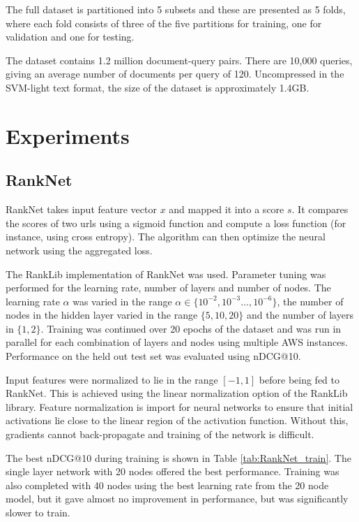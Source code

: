 \documentclass[english]{article}
\theoremstyle{definition}
\begin{document}
\begin{multicols}{2}
The full dataset is partitioned into 5 subsets and these are presented as 5 folds, where each fold consists of three of the five partitions for training, one for validation and one for testing.  

The dataset contains 1.2 million document-query pairs.  There are 10,000 queries, giving an average number of documents per query of 120.  Uncompressed in the SVM-light text format, the size of the dataset is approximately 1.4GB.

\section{Experiments}

\subsection{RankNet}

RankNet takes input feature vector $x$ and mapped it into a score $s$. It compares the scores of two urls using a sigmoid function and compute a loss function (for instance, using cross entropy). The algorithm can then optimize the neural network using the aggregated loss.

The RankLib \cite{Lemur} implementation of RankNet was used.  Parameter tuning was performed for the learning rate, number of layers and number of nodes.  The learning rate $\alpha$ was varied in the range $\alpha \in \{10^{-2},10^{-3} \ldots, 10^{-6}\}$, the number of nodes in the hidden layer varied in the range $\{5, 10, 20\}$ and the number of layers in $\{1, 2\}$.  Training was continued over 20 epochs of the dataset and was run in parallel for each combination of layers and nodes using multiple AWS instances.  Performance on the held out test set was evaluated using nDCG@10. 

Input features were normalized to lie in the range $[-1,1]$ before being fed to RankNet.  This is achieved using the linear normalization option of the RankLib library.  Feature normalization is import for neural networks to ensure that initial activations lie close to the linear region of the activation function.  Without this, gradients cannot back-propagate and training of the network is difficult. 

The best nDCG@10 during training is shown in Table \ref{tab:RankNet_train}.  The single layer network with 20 nodes offered the best performance.  Training was also completed with 40 nodes using the best learning rate from the 20 node model, but it gave almost no improvement in performance, but was significantly slower to train. 


\end{multicols}
\end{document}
